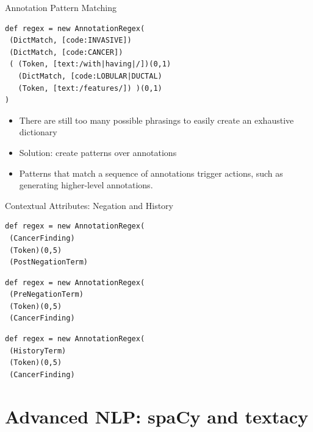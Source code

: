 \documentclass[10pt]{beamer}
\begin{document}
\begin{frame}[fragile]{Annotation Pattern Matching}

\begin{lstlisting}[frame=single]
def regex = new AnnotationRegex(
 (DictMatch, [code:INVASIVE])
 (DictMatch, [code:CANCER])
 ( (Token, [text:/with|having|/])(0,1)
   (DictMatch, [code:LOBULAR|DUCTAL)
   (Token, [text:/features/]) )(0,1)
)
\end{lstlisting}

\begin{itemize}
	\item There are still too many possible phrasings to easily create an exhaustive dictionary
	\item Solution: create \alert{patterns} over annotations
	\item Patterns that match a sequence of annotations trigger \alert{actions}, such as generating higher-level annotations.
\end{itemize}

\end{frame}

\begin{frame}[fragile]{Contextual Attributes: Negation and History}
\begin{lstlisting}[frame=single]
def regex = new AnnotationRegex(
 (CancerFinding)
 (Token)(0,5)
 (PostNegationTerm)
\end{lstlisting}

\begin{lstlisting}[frame=single]
def regex = new AnnotationRegex(
 (PreNegationTerm)
 (Token)(0,5)
 (CancerFinding)
\end{lstlisting}

\begin{lstlisting}[frame=single]
def regex = new AnnotationRegex(
 (HistoryTerm)
 (Token)(0,5)
 (CancerFinding)
\end{lstlisting}

\end{frame}

\section{Advanced NLP: spaCy and textacy}

%
\end{document}
